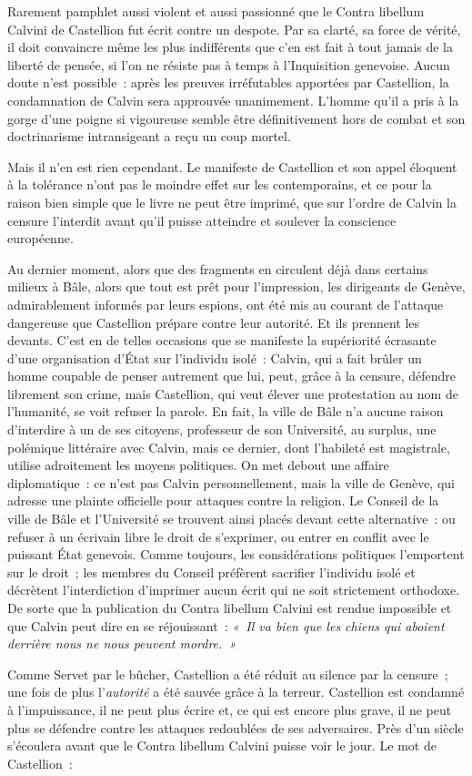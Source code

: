 \documentclass[french,twoside]{book} %
\newcommand\chaptercont{} %
\begin{document}
\chaptercont
\noindent Rarement pamphlet aussi violent et aussi passionné que le Contra libellum Calvini de Castellion fut écrit contre un despote. Par sa clarté, sa force de vérité, il doit convaincre même les plus indifférents que c’en est fait à tout jamais de la liberté de pensée, si l’on ne résiste pas à temps à l’Inquisition genevoise. Aucun doute n’est possible : après les preuves irréfutables apportées par Castellion, la condamnation de Calvin sera approuvée unanimement. L’homme qu’il a pris à la gorge d’une poigne si vigoureuse semble être définitivement hors de combat et son doctrinarisme intransigeant a reçu un coup mortel.\par
Mais il n’en est rien cependant. Le manifeste de Castellion et son appel éloquent à la tolérance n’ont pas le moindre effet sur les contemporains, et ce pour la raison bien simple que le livre ne peut être imprimé, que sur l’ordre de Calvin la censure l’interdit avant qu’il puisse atteindre et soulever la conscience européenne.\par
Au dernier moment, alors que des fragments en circulent déjà dans certains milieux à Bâle, alors que tout est prêt pour l’impression, les dirigeants de Genève, admirablement informés par leurs espions, ont été mis au courant de l’attaque dangereuse que Castellion prépare contre leur autorité. Et ils prennent les devants. C’est en de telles occasions que se manifeste la supériorité écrasante d’une organisation d’État sur l’individu isolé : Calvin, qui a fait brûler un homme coupable de penser autrement que lui, peut, grâce à la censure, défendre librement son crime, mais Castellion, qui veut élever une protestation au nom de l’humanité, se voit refuser la parole. En fait, la ville de Bâle n’a aucune raison d’interdire à un de ses citoyens, professeur de son Université, au surplus, une polémique littéraire avec Calvin, mais ce dernier, dont l’habileté est magistrale, utilise adroitement les moyens politiques. On met debout une affaire diplomatique : ce n’est pas Calvin personnellement, mais la ville de Genève, qui adresse une plainte officielle pour attaques contre la religion. Le Conseil de la ville de Bâle et l’Université se trouvent ainsi placés devant cette alternative : ou refuser à un écrivain libre le droit de s’exprimer, ou entrer en conflit avec le puissant État genevois. Comme toujours, les considérations politiques l’emportent sur le droit ; les membres du Conseil préfèrent sacrifier l’individu isolé et décrètent l’interdiction d’imprimer aucun écrit qui ne soit strictement orthodoxe. De sorte que la publication du Contra libellum Calvini est rendue impossible et que Calvin peut dire en se réjouissant : \emph{« Il va bien que les chiens qui aboient derrière nous ne nous peuvent mordre. »}\par
Comme Servet par le bûcher, Castellion a été réduit au silence par la censure ; une fois de plus l’\emph{autorité} a été sauvée grâce à la terreur. Castellion est condamné à l’impuissance, il ne peut plus écrire et, ce qui est encore plus grave, il ne peut plus se défendre contre les attaques redoublées de ses adversaires. Près d’un siècle s’écoulera avant que le Contra libellum Calvini puisse voir le jour. Le mot de Castellion :\par
\end{document}
